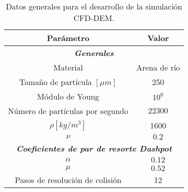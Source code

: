 \begin{table}[h!]
	\centering
	\begin{adjustbox}{max width = 0.8\textwidth}
	\begin{tabular}{|c|c|}
		\hline
		\textbf{Par\'ametro} & \textbf{Valor} \\ \hline
		\multicolumn{2}{|c|}{\textbf{\textit{Generales}}} \\ \hline
		Material & Arena de r\'io \\ \hline
		Tama\~no de part\'icula $[\mu m]$ & 250 \\ \hline
		M\'odulo de Young & $10 ^6$ \\ \hline
		 N\'umero de part\'iculas por segundo & $22300$ \\
		  \hline
		 $\rho [kg/m^3]$ & 1600 \\ \hline
		 $\nu$ & $0.2$ \\ \hline
		 \multicolumn{2}{|c|}{\textbf{\textit{Coeficientes de par de resorte Dashpot}}} \\ \hline
		 $\alpha$ & $0.12$ \\ \hline
		 $\mu$ & $0.52$ \\ \hline
		 Pasos de resoluci\'on de colisi\'on & 12 \\ \hline
	\end{tabular}
	\end{adjustbox}
	\caption{Datos generales para el desarrollo de la simulaci\'on CFD-DEM.}
	\label{CFDEMdata}
\end{table}

\newpage

